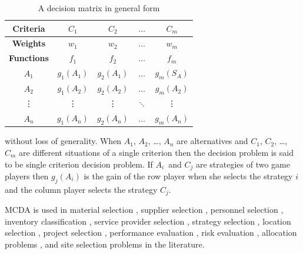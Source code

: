 \documentclass[preprint,review, 12pt, a4paper]{elsarticle}
\begin{document}
\begin{table}[H]
	\centering
	\begin{tabular}{|c|c|c|c|c|}
		\hline
		\textbf{Criteria} & {$C_1$} & {$C_2$} & $\dots$ & {$C_m$} \\
		\hline
		\textbf{Weights} & {$w_1$} & {$w_2$} & $\dots$ & {$w_m$} \\
		\hline
		\textbf{Functions} & {$f_1$} & {$f_2$} & $\dots$ & {$f_m$} \\
		\hline
		\hline
		{$A_1$} & {$g_1(A_1)$} & {$g_2(A_1)$} & $\dots$ & {$g_m(S_A)$} \\
		\hline
		{$A_2$} & {$g_1(A_2)$} & {$g_2(A_2)$} & $\dots$ & {$g_m(A_2)$} \\
		\hline
		\vdots & \vdots & \vdots & $\ddots$ & \vdots  \\
		\hline		
		$A_n$ & $g_1(A_n) $ &  $g_2(A_n) $ & $\dots$ &  $g_m(A_n) $ \\
		\hline   
	\end{tabular}
	\caption{A decision matrix in general form}
	\label{table:sample_decision_matrix} 
\end{table}

\noindent without loss of generality. When $A_1$, $A_2$, \dots, $A_n$ are alternatives and $C_1$, $C_2$, \dots, $C_m$ are different situations of a single criterion then the decision problem is said to be single criterion decision problem. If $A_i$ and $C_j$ are strategies of two game players then $g_j(A_i)$ is the gain of the row player when she selects the strategy $i$ and the column player selects the strategy $C_j$. 

{\color{blue}MCDA is used in material selection \cite{material, material2}, supplier selection \cite{marcos, allocation1}, personnel selection \cite{personnel}, inventory classification \cite{edas}, service provider selection \cite{3PL, reverse, service, service2}, strategy selection \cite{strategy1, strategy2, strategy3}, location selection \cite{loc1, loc2}, project selection \cite{project1, project2, project3}, performance evaluation \cite{performance1, performance2, performance3}, risk evaluation \cite{risk1, risk2}, allocation problems \cite{allocation1, allocation2, allocation3}, and site selection \cite{site1, site2, site3} problems in the literature.}
\end{document}
